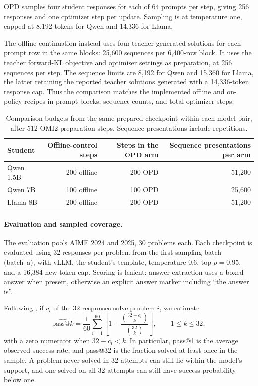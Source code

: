 OPD samples four student responses for each of 64 prompts per step, giving 256 responses and one optimizer step per update. Sampling is at temperature one, capped at 8,192 tokens for Qwen and 14,336 for Llama. 

The offline continuation instead uses four teacher-generated solutions for each prompt row in the same blocks: 25,600 sequences per 6,400-row block. It uses the teacher forward-KL objective and optimizer settings as preparation, at 256 sequences per step. The sequence limits are 8,192 for Qwen and 15,360 for Llama, the latter retaining the reported teacher solutions generated with a 14,336-token response cap. Thus the comparison matches the implemented offline and on-policy recipes in prompt blocks, sequence counts, and total optimizer steps.

\begin{table}[t]
\centering\small
\setlength{\tabcolsep}{5pt}
\begin{tabular}{lrrr}
\toprule
Student & Offline-control steps & Steps in the OPD arm & Sequence presentations per arm\\
\midrule
Qwen 1.5B & 200 offline & 200 OPD & 51,200\\
Qwen 7B & 100 offline & 100 OPD & 25,600\\
Llama 8B & 200 offline & 200 OPD & 51,200\\
\bottomrule
\end{tabular}
\caption{Comparison budgets from the same prepared checkpoint within each model pair, after 512 OMI2 preparation steps. Sequence presentations include repetitions.}
\label{tab:preparation-budgets}
\end{table}


\paragraph{Evaluation and sampled coverage.}
The evaluation pools AIME 2024 and 2025, 30 problems each. Each checkpoint is evaluated using 32 responses per problem from the first sampling batch (batch~a), with vLLM, the student's template, temperature $0.6$, top-$p=0.95$, and a 16,384-new-token cap. Scoring is lenient: answer extraction uses a boxed answer when present, otherwise an explicit answer marker including ``the answer is''.

Following \citet{chen2021evaluatingcode}, if $c_i$ of the 32 responses solve problem $i$, we estimate
\begin{equation}
\widehat{\mathrm{pass@}k}=\frac1{60}\sum_{i=1}^{60}\left[1-\frac{\binom{32-c_i}{k}}{\binom{32}{k}}\right],\qquad 1\le k\le32,
\label{eq:preparation-passk}
\end{equation}
with a zero numerator when $32-c_i<k$. In particular, pass@1 is the average observed success rate, and pass@32 is the fraction solved at least once in the sample. A problem never solved in 32 attempts can still lie within the model's support, and one solved on all 32 attempts can still have success probability below one.

